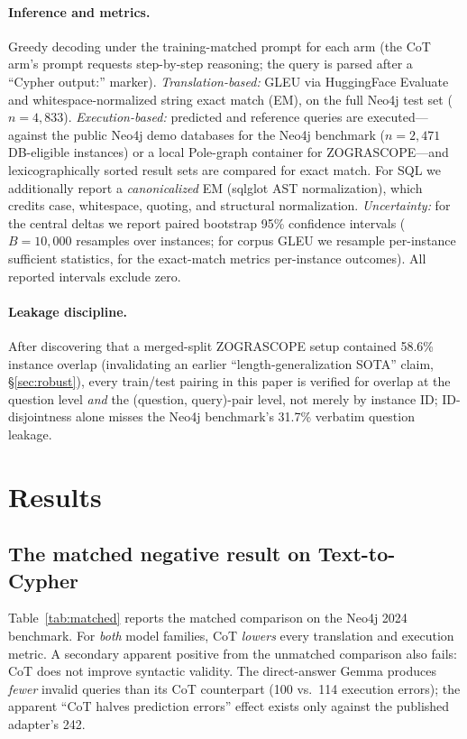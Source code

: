 \documentclass[11pt]{article}
\begin{document}
\paragraph{Inference and metrics.} Greedy decoding under the training-matched prompt for each arm
(the CoT arm's prompt requests step-by-step reasoning; the query is parsed after a ``Cypher output:''
marker). \emph{Translation-based:} GLEU \citep{wu2016gnmt} via HuggingFace Evaluate and
whitespace-normalized string exact match (EM), on the full Neo4j test set ($n{=}4{,}833$).
\emph{Execution-based:} predicted and reference queries are executed---against the public Neo4j demo
databases for the Neo4j benchmark ($n{=}2{,}471$ DB-eligible instances) or a local Pole-graph
container for ZOGRASCOPE---and lexicographically sorted result sets are compared for exact match.
For SQL we additionally report a \emph{canonicalized} EM (sqlglot AST normalization), which credits
case, whitespace, quoting, and structural normalization. \emph{Uncertainty:} for the central deltas
we report paired bootstrap 95\% confidence intervals ($B{=}10{,}000$ resamples over instances; for
corpus GLEU we resample per-instance sufficient statistics, for the exact-match metrics per-instance
outcomes). All reported intervals exclude zero.

\paragraph{Leakage discipline.} After discovering that a merged-split ZOGRASCOPE setup contained
58.6\% instance overlap (invalidating an earlier ``length-generalization SOTA'' claim, \S\ref{sec:robust}),
every train/test pairing in this paper is verified for overlap at the question level \emph{and} the
(question, query)-pair level, not merely by instance ID; ID-disjointness alone misses the Neo4j
benchmark's 31.7\% verbatim question leakage.

\section{Results}

\subsection{The matched negative result on Text-to-Cypher}
\label{sec:matched}
Table~\ref{tab:matched} reports the matched comparison on the Neo4j 2024 benchmark. For \emph{both}
model families, CoT \emph{lowers} every translation and execution metric. A secondary apparent
positive from the unmatched comparison also fails: CoT does not improve syntactic validity. The
direct-answer Gemma produces \emph{fewer} invalid queries than its CoT counterpart (100 vs.\ 114
execution errors); the apparent ``CoT halves prediction errors'' effect exists only against the
published adapter's 242.
\end{document}
